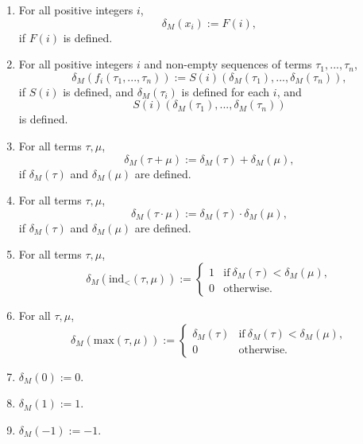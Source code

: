 \documentclass[11pt]{article}
\begin{document}
\begin{enumerate}
	\item For all positive integers $i$,
		\begin{equation}
			\delta_M(x_i) := F(i),
		\end{equation}
		if $F(i)$ is defined.
	\item For all positive integers $i$ and non-empty sequences of terms $\tau_1, ..., \tau_n$,
		\begin{equation}
			\delta_M(f_i(\tau_1, ..., \tau_n)) := S(i)(\delta_M(\tau_1), ..., \delta_M(\tau_n)),
		\end{equation}
		if $S(i)$ is defined, and $\delta_M(\tau_i)$ is defined for each $i$, and 
		\begin{equation}
			S(i)(\delta_M(\tau_1), ..., \delta_M(\tau_n))
		\end{equation}
		is defined.
	\item For all terms $\tau, \mu$,
		\begin{equation}
			\delta_M(\tau + \mu) := \delta_M(\tau) + \delta_M(\mu),
		\end{equation}
		if $\delta_M(\tau)$ and $\delta_M(\mu)$ are defined.
	\item For all terms $\tau, \mu$,
		\begin{equation}
			\delta_M(\tau \cdot \mu) := \delta_M(\tau) \cdot \delta_M(\mu),
		\end{equation}
		if $\delta_M(\tau)$ and $\delta_M(\mu)$ are defined.
	\item For all terms $\tau, \mu$,
		\begin{equation}
			\delta_M(\text{ind}_<(\tau, \mu)) := \begin{cases}
				1 & \text{if}\ \delta_M(\tau) < \delta_M(\mu), \\
				0 & \text{otherwise}.
			\end{cases}
		\end{equation}
	\item For all $\tau, \mu$,
		\begin{equation}
			\delta_M(\text{max}(\tau, \mu)) := \begin{cases}
				\delta_M(\tau) & \text{if}\ \delta_M(\tau) < \delta_M(\mu), \\
				0 & \text{otherwise}.
			\end{cases}
		\end{equation}
	\item $\delta_M(0) := 0$.
	\item $\delta_M(1) := 1$.
	\item $\delta_M(-1) := -1$.

\end{enumerate}
\end{document}
